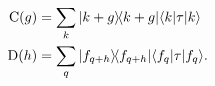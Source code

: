 
\begin{align}
  \operatorname{C}(g) &= \sum_{k} |k+g\rangle\!\langle k+g| \langle k | \tau | k \rangle\\
  \operatorname{D}(h) &= \sum_{q} |f_{q+h}\rangle\!\langle f_{q+h}| \langle f_{q} | \tau | f_{q} \rangle.
\end{align}
